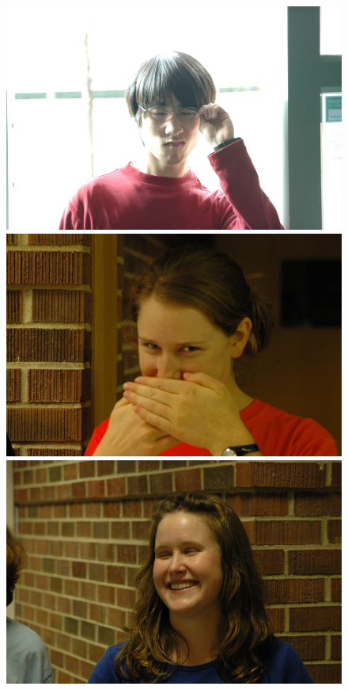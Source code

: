\begin{figure}
\includegraphics[scale=0.35,clip=true]{figures_cvpr/examples/5/failure/DSC_1669.JPG} 
\includegraphics[scale=0.35,clip=true]{figures_cvpr/examples/5/failure/DSC_1800.JPG} 
\includegraphics[scale=0.35,clip=true]{figures_cvpr/examples/5/failure/DSC_1870.JPG} 

\end{figure}

